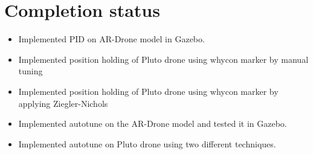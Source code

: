 \documentclass[a4paper,12pt,oneside]{book}
\begin{document}
\section{Completion status}
\begin{itemize}
  \item Implemented PID on AR-Drone model in Gazebo.
  \item Implemented position holding of Pluto drone using whycon marker by manual tuning
  \item Implemented position holding of Pluto drone using whycon marker by applying Ziegler-Nichols
  \item Implemented autotune on the AR-Drone model and tested it in Gazebo.
  \item Implemented autotune on Pluto drone using two different techniques.\\\\\
\end{itemize}
\end{document}
